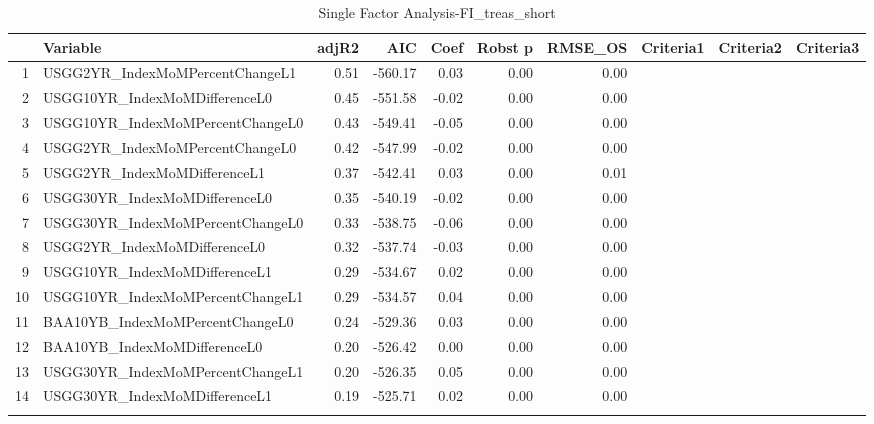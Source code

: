 \begin{longtable}{rlrrrrrlll}
  \hline
 & Variable & adjR2 & AIC & Coef & Robst p & RMSE\_OS & Criteria1 & Criteria2 & Criteria3 \\ 
  \hline
1 & USGG2YR\_IndexMoMPercentChangeL1 & 0.51 & -560.17 & 0.03 & 0.00 & 0.00 &  &  &  \\ 
  2 & USGG10YR\_IndexMoMDifferenceL0 & 0.45 & -551.58 & -0.02 & 0.00 & 0.00 &  &  &  \\ 
  3 & USGG10YR\_IndexMoMPercentChangeL0 & 0.43 & -549.41 & -0.05 & 0.00 & 0.00 &  &  &  \\ 
  4 & USGG2YR\_IndexMoMPercentChangeL0 & 0.42 & -547.99 & -0.02 & 0.00 & 0.00 &  &  &  \\ 
  5 & USGG2YR\_IndexMoMDifferenceL1 & 0.37 & -542.41 & 0.03 & 0.00 & 0.01 &  &  &  \\ 
  6 & USGG30YR\_IndexMoMDifferenceL0 & 0.35 & -540.19 & -0.02 & 0.00 & 0.00 &  &  &  \\ 
  7 & USGG30YR\_IndexMoMPercentChangeL0 & 0.33 & -538.75 & -0.06 & 0.00 & 0.00 &  &  &  \\ 
  8 & USGG2YR\_IndexMoMDifferenceL0 & 0.32 & -537.74 & -0.03 & 0.00 & 0.00 &  &  &  \\ 
  9 & USGG10YR\_IndexMoMDifferenceL1 & 0.29 & -534.67 & 0.02 & 0.00 & 0.00 &  &  &  \\ 
  10 & USGG10YR\_IndexMoMPercentChangeL1 & 0.29 & -534.57 & 0.04 & 0.00 & 0.00 &  &  &  \\ 
  11 & BAA10YB\_IndexMoMPercentChangeL0 & 0.24 & -529.36 & 0.03 & 0.00 & 0.00 &  &  &  \\ 
  12 & BAA10YB\_IndexMoMDifferenceL0 & 0.20 & -526.42 & 0.00 & 0.00 & 0.00 &  &  &  \\ 
  13 & USGG30YR\_IndexMoMPercentChangeL1 & 0.20 & -526.35 & 0.05 & 0.00 & 0.00 &  &  &  \\ 
  14 & USGG30YR\_IndexMoMDifferenceL1 & 0.19 & -525.71 & 0.02 & 0.00 & 0.00 &  &  &  \\ 
   \hline
\hline
\caption{Single Factor Analysis-FI_treas_short} 
\end{longtable}
